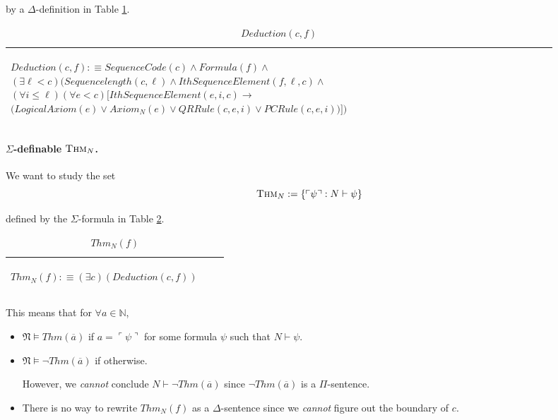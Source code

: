 \documentclass[11pt,letterpaper]{book}
\theoremstyle{definition}
\begin{document}
by a $\Delta$-definition in Table \ref{box:deduction}.


\begin{table}[h]
\caption{$Deduction(c,f)$}
\label{box:deduction}
\begin{tabular}{|p{0.9\linewidth}|}
\hline
\rule{0pt}{3ex}
\begin{center}
$Deduction(c,f) : \equiv  SequenceCode(c) \land Formula(f) \land $
$ (\exists \ell < c) \bigg( Sequencelength(c, \ell) \land IthSequenceElement(f, \ell, c) \land $
$ (\forall i \leq \ell ) (\forall e < c) \bigg[ IthSequenceElement(e, i, c) \rightarrow $
$ \bigg( LogicalAxiom(e) \lor Axiom_N (e) \lor QRRule(c, e, i) \lor PCRule(c, e, i) \bigg)  \bigg]  \bigg) $
\end{center}\\
\hline
\end{tabular}
\end{table}

\paragraph{$\Sigma$-definable $\text{\textsc{Thm}}_N$.}


We want to study the set
\begin{equation}
\label{eq:thm_N}
\text{\textsc{Thm}}_N := \{  \ulcorner \psi \urcorner : N \vdash \psi \} 
\end{equation}

defined by the $\Sigma$-formula in Table \ref{box:thm_N}.

\begin{table}[ht!]
\caption{$Thm_N(f)$}
\label{box:thm_N}
\begin{tabular}{|p{0.9\linewidth}|}
\hline
\rule{0pt}{3ex}
\begin{center}
$Thm_N(f) : \equiv  (\exists c ) (Deduction(c, f)) $
\end{center}\\
\hline
\end{tabular}
\end{table}

This means that for $\forall a \in \mathbb{N}$,
\begin{itemize}
\item{$\mathfrak{N} \models Thm(\overline{a})$ if $a = \ulcorner  \psi\urcorner$ for some formula $\psi$ such that $N \vdash \psi$.}
\item{$\mathfrak{N}  \models \lnot Thm(\overline{a})$ if otherwise.

However, we \emph{cannot} conclude $N \vdash \lnot Thm(\overline{a})$ since $\lnot Thm(\overline{a})$ is a $\Pi$-sentence.}
\item{There is no way to rewrite $Thm_N(f)$ as a $\Delta$-sentence since we \emph{cannot} figure out the boundary of $c$.}
\end{itemize}
\end{document}
